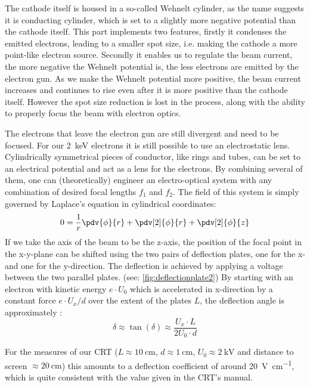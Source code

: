 The cathode itself is housed in a so-called Wehnelt cylinder, as the name suggests it is conducting cylinder, which is set to a slightly more negative potential than the cathode itself. This part implements two features, firstly it condenses the emitted electrons, leading to a smaller spot size, i.e. making the cathode a more point-like electron source. Secondly it enables us to regulate the beam current, the more negative the Wehnelt potential is, the less electrons are emitted by the electron gun. As we make the Wehnelt potential more positive, the beam current increases and continues to rise even after it is more positive than the cathode itself. However the spot size reduction is lost in the process, along with the ability to properly focus the beam with electron optics.

The electrons that leave the electron gun are still divergent and need to be focused. For our \SI{2}{\kilo\electronvolt} electrons it is still possible to use an electrostatic lens. Cylindrically symmetrical pieces of conductor, like rings and tubes, can be set to an electrical potential and act as a lens for the electrons. By combining several of them, one can (theoretically) engineer an electro-optical system with any combination of desired focal lengths $f_1$ and $f_2$. The field of this system is simply governed by Laplace's equation in cylindrical coordinates:
\begin{equation}
	0=\dfrac{1}{r}\pdv{\phi}{r}+\pdv[2]{\phi}{r}+\pdv[2]{\phi}{z}
\end{equation}
If we take the axis of the beam to be the z-axis, the position of the focal point in the x-y-plane can be shifted using the two pairs of deflection plates, one for the x- and one for the y-direction. The deflection is achieved by applying a voltage between the two parallel plates. (see: \cref{fig:deflectionplate2}) By starting with an electron with kinetic energy $e \cdot U_0$ which is accelerated in x-direction by a constant force $e\cdot U_x / d$ over the extent of the plates $L$, the deflection angle is approximately \cite{Demtroeder3}:
\begin{equation}\label{key}
	\delta \approx \tan(\delta) \approx \frac{U_x\cdot L}{2 U_0 \cdot d}
\end{equation}

For the measures of our CRT ($ L \approx \SI{10}{\centi\meter}$, $d \approx \SI{1}{\centi\meter}$, $U_0 \approx \SI{2}{\kilo\volt}$ and distance to screen $\approx \SI{20}{\centi\meter}$) this amounts to a deflection coefficient of around \SI{20}{\volt\per\centi\meter}, which is quite consistent with the value given in the CRT's manual. 

